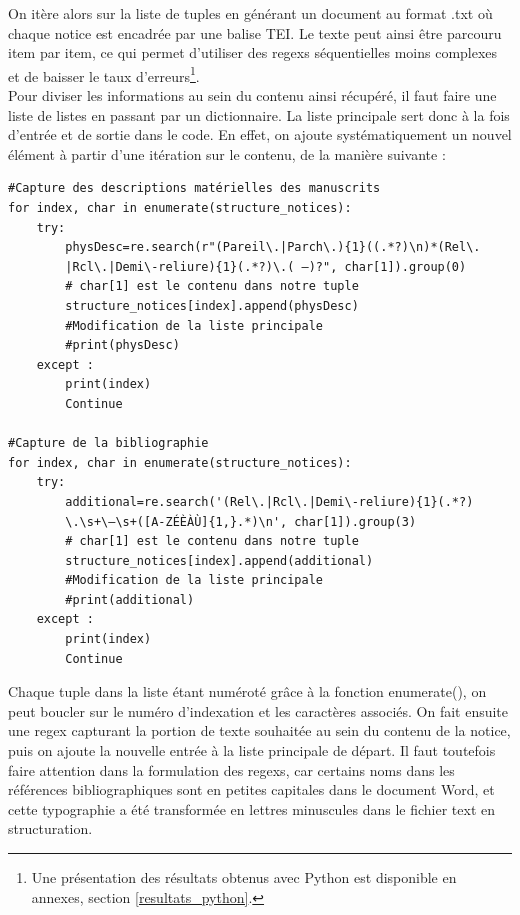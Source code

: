 \documentclass[a4paper,12pt,twoside]{book}
\begin{document}
On itère alors sur la liste de tuples en générant un document au format .txt où chaque notice est encadrée par une balise TEI. Le texte peut ainsi être parcouru item par item, ce qui permet d’utiliser des regexs séquentielles moins complexes et de baisser le taux d’erreurs\footnote{Une présentation des résultats obtenus avec Python est disponible en annexes, section \ref{resultats_python}.}.\\

Pour diviser les informations au sein du contenu ainsi récupéré, il faut faire une liste de listes en passant par un dictionnaire. La liste principale sert donc à la fois d'entrée et de sortie dans le code. En effet, on ajoute systématiquement un nouvel élément à partir d’une itération sur le contenu, de la manière suivante :
\begin{verbatim}
#Capture des descriptions matérielles des manuscrits 
for index, char in enumerate(structure_notices):
    try:
        physDesc=re.search(r"(Pareil\.|Parch\.){1}((.*?)\n)*(Rel\.
        |Rcl\.|Demi\-reliure){1}(.*?)\.( —)?", char[1]).group(0)  
        # char[1] est le contenu dans notre tuple
        structure_notices[index].append(physDesc)  
        #Modification de la liste principale
        #print(physDesc)
    except :
        print(index)
        Continue

#Capture de la bibliographie
for index, char in enumerate(structure_notices):
    try:
        additional=re.search('(Rel\.|Rcl\.|Demi\-reliure){1}(.*?)
        \.\s+\—\s+([A-ZÉÈÀÙ]{1,}.*)\n', char[1]).group(3)  
        # char[1] est le contenu dans notre tuple
        structure_notices[index].append(additional) 
        #Modification de la liste principale
        #print(additional)
    except :
        print(index)
        Continue
\end{verbatim}
Chaque tuple dans la liste étant numéroté grâce à la fonction enumerate(), on peut boucler sur le numéro d'indexation et les caractères associés. On fait ensuite une regex capturant la portion de texte souhaitée au sein du contenu de la notice, puis on ajoute la nouvelle entrée à la liste principale de départ. 
Il faut toutefois faire attention dans la formulation des regexs, car certains noms dans les références bibliographiques sont en petites capitales dans le document Word, et cette typographie a été transformée en lettres minuscules dans le fichier text en structuration. 
\end{document}

